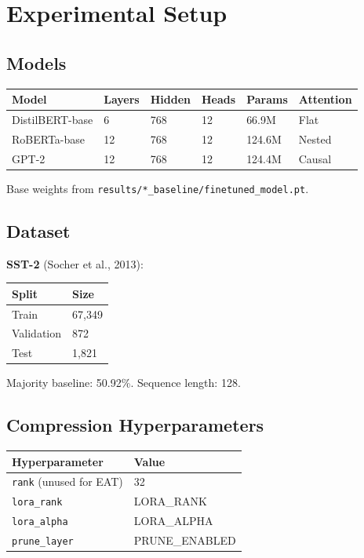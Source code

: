 
\section{Experimental Setup}

\subsection{Models}

\begin{table}[H]
\centering
\small
\begin{tabular}{llllll}
\toprule
\textbf{Model} & \textbf{Layers} & \textbf{Hidden} & \textbf{Heads} & \textbf{Params} & \textbf{Attention} \\
\midrule
DistilBERT-base & 6 & 768 & 12 & 66.9M & Flat \\
RoBERTa-base & 12 & 768 & 12 & 124.6M & Nested \\
GPT-2 & 12 & 768 & 12 & 124.4M & Causal \\
\bottomrule
\end{tabular}
\end{table}

Base weights from \texttt{results/*\_baseline/finetuned\_model.pt}.

\subsection{Dataset}

\textbf{SST-2} (Socher et al., 2013):

\begin{table}[H]
\centering
\small
\begin{tabular}{ll}
\toprule
\textbf{Split} & \textbf{Size} \\
\midrule
Train & 67,349 \\
Validation & 872 \\
Test & 1,821 \\
\bottomrule
\end{tabular}
\end{table}

Majority baseline: 50.92\%. Sequence length: 128.

\subsection{Compression Hyperparameters}

\begin{table}[H]
\centering
\small
\begin{tabular}{ll}
\toprule
\textbf{Hyperparameter} & \textbf{Value} \\
\midrule
\texttt{rank} (unused for EAT) & 32 \\
\texttt{lora\_rank} & {{LORA\_RANK}} \\
\texttt{lora\_alpha} & {{LORA\_ALPHA}} \\
\texttt{prune\_layer} & {{PRUNE\_ENABLED}} \\
\bottomrule
\end{tabular}
\end{table}

